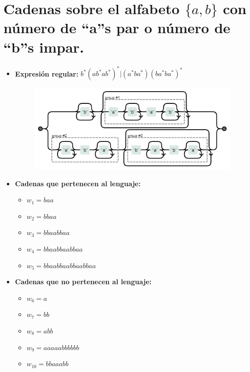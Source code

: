 \documentclass[11pt]{report}
\begin{document}
\section{Cadenas sobre el alfabeto \texorpdfstring{$\{a, b\}$}{\{a, b\}} con número de “a”s par o número de “b”s impar.}
\begin{itemize}
  \item \textbf{Expresión regular:} $b^*(ab^*ab^*)^*|(a^*ba^*)(ba^*ba^*)^*$
    \begin{figure}[H]
      \centering
      \includegraphics[scale=0.9]{img/op_basicos_04.png}
    \end{figure}
  \item \textbf{Cadenas que pertenecen al lenguaje: }
    \begin{itemize}
      \item $w_1 = baa$
      \item $w_2 = bbaa$
      \item $w_3 = bbaabbaa$
      \item $w_4 = bbaabbaabbaa$
      \item $w_5 = bbaabbaabbaabbaa$
    \end{itemize}
  \item \textbf{Cadenas que no pertenecen al lenguaje: }
    \begin{itemize}
      \item $w_6 = a$
      \item $w_7 = bb$
      \item $w_8 = abb$
      \item $w_9 = aaaaabbbbbb$
      \item $w_{10} = bbaaabb$
    \end{itemize}

\end{itemize}

\newpage
\end{document}
